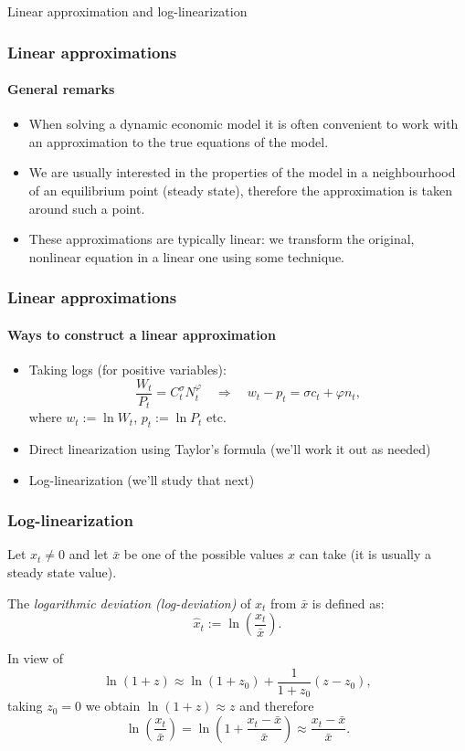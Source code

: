 \documentclass[10pt]{beamer}
\theoremstyle{definition}
\begin{document}
\begin{section}{Linear approximation and log-linearization}\label{sec:llin}

\begin{frame}
\frametitle{Linear approximations}
\framesubtitle{General remarks}
\begin{itemize}\itemsep1em
\item When solving a dynamic economic model it is often convenient to work with an approximation to the true equations of the model.
\item We are usually interested in the properties of the model in a neighbourhood of an equilibrium point (steady state), therefore the approximation is taken around such a point. 
\item These approximations are typically linear: we transform the original, nonlinear equation in a linear one using some technique.
\end{itemize}
\end{frame}


\begin{frame}
\frametitle{Linear approximations}
\framesubtitle{Ways to construct a linear approximation}
\begin{itemize}\itemsep1em
\item Taking logs (for positive variables):
\[ \frac{W_t}{P_t} = C_t^\sigma N_t^\varphi \quad\Longrightarrow\quad w_t - p_t = \sigma c_t + \varphi n_t, \] where $ w_t := \ln W_t $, $ p_t := \ln P_t $ etc. 
\item Direct linearization using Taylor's formula (we'll work it out as needed)
\item Log-linearization (we'll study that next)
\end{itemize}
\end{frame}




\begin{frame} \frametitle{Log-linearization}
Let $x_t \neq 0$ and let $\bar{x}$ be one of the possible values $x$ can take (it is usually a steady state value).

The \emph{logarithmic deviation (log-deviation)} of $x_t$ from $\bar{x}$ is defined as: $$\hat{x}_t := \ln \left(\frac{x_t}{\bar{x}}\right).$$

In view of $$\ln (1+z)\approx \ln (1+z_0)+ \frac{1}{1+z_0}(z-z_0),$$ taking $z_0=0$ we obtain $\ln (1+z) \approx z$ and therefore $$\ln \left(\frac{x_t}{\bar{x}}\right) = \ln \left(1+\frac{x_t-\bar{x}}{\bar{x}}\right)\approx \frac{x_t-\bar{x}}{\bar{x}}. $$
\end{frame}


\end{section}
\end{document}
